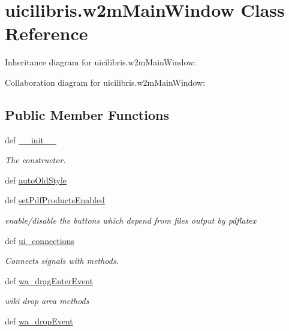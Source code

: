 \hypertarget{classuicilibris_1_1w2mMainWindow}{\section{uicilibris.\-w2m\-Main\-Window \-Class \-Reference}
\label{classuicilibris_1_1w2mMainWindow}
}


\-Inheritance diagram for uicilibris.\-w2m\-Main\-Window\-:


\-Collaboration diagram for uicilibris.\-w2m\-Main\-Window\-:
\subsection*{\-Public \-Member \-Functions}
\begin{DoxyCompactItemize}
\item 
def \hyperlink{classuicilibris_1_1w2mMainWindow_a5ccc00df65d8f23d493e52b40d501aa9}{\-\_\-\-\_\-init\-\_\-\-\_\-}
\begin{DoxyCompactList}\small\item\em \-The constructor. \end{DoxyCompactList}\item 
def \hyperlink{classuicilibris_1_1w2mMainWindow_acce7cb9f3eb7c191058792d19aa372d2}{auto\-Old\-Style}
\item 
def \hyperlink{classuicilibris_1_1w2mMainWindow_a63405a7e53f8162caf4cc917954ec971}{set\-Pdf\-Products\-Enabled}
\begin{DoxyCompactList}\small\item\em enable/disable the buttons which depend from files output by pdflatex \end{DoxyCompactList}\item 
def \hyperlink{classuicilibris_1_1w2mMainWindow_a92db5c455a549b7a1a7dd6f0ae341611}{ui\-\_\-connections}
\begin{DoxyCompactList}\small\item\em \-Connects signals with methods. \end{DoxyCompactList}\item 
def \hyperlink{classuicilibris_1_1w2mMainWindow_a897d993b629f629317fff71b4c3dcaca}{wa\-\_\-drag\-Enter\-Event}
\begin{DoxyCompactList}\small\item\em wiki drop area methods \end{DoxyCompactList}\item 
def \hyperlink{classuicilibris_1_1w2mMainWindow_ad31a0058c04bb84ca92c70617e29eced}{wa\-\_\-drop\-Event}

\end{DoxyCompactItemize}

